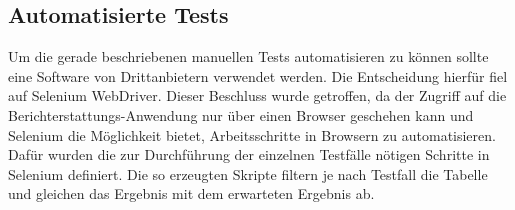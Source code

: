 \subsection{Automatisierte Tests}
Um die gerade beschriebenen manuellen Tests automatisieren zu können sollte eine Software von Drittanbietern verwendet werden. Die Entscheidung hierfür fiel auf Selenium WebDriver. Dieser Beschluss wurde getroffen, da der Zugriff auf die Berichterstattungs-Anwendung nur über einen Browser geschehen kann und Selenium die Möglichkeit bietet, Arbeitsschritte in Browsern zu automatisieren. Dafür wurden die zur Durchführung der einzelnen Testfälle nötigen Schritte in Selenium definiert. Die so erzeugten Skripte filtern je nach Testfall die Tabelle und gleichen das Ergebnis mit dem erwarteten Ergebnis ab.
